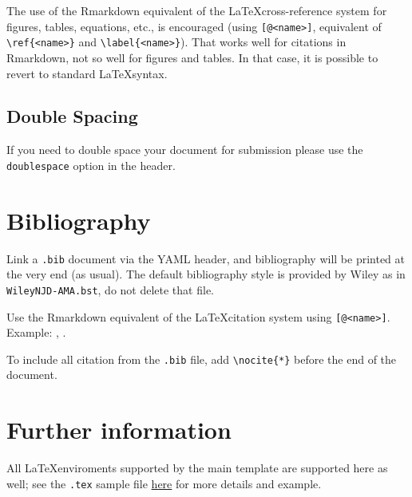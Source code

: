 \documentclass[AMA,STIX1COL,]{WileyNJD-v2}
\begin{document}
The use of the Rmarkdown equivalent of the \LaTeX cross-reference system
for figures, tables, equations, etc., is encouraged (using
\texttt{{[}@\textless{}name\textgreater{}{]}}, equivalent of
\texttt{\textbackslash{}ref\{\textless{}name\textgreater{}\}} and
\texttt{\textbackslash{}label\{\textless{}name\textgreater{}\}}). That
works well for citations in Rmarkdown, not so well for figures and
tables. In that case, it is possible to revert to standard
\LaTeX syntax.

\hypertarget{double-spacing}{%
\subsection{Double Spacing}\label{double-spacing}}

If you need to double space your document for submission please use the
\texttt{doublespace} option in the header.

\hypertarget{bibliography}{%
\section{Bibliography}\label{bibliography}}

Link a \texttt{.bib} document via the YAML header, and bibliography will
be printed at the very end (as usual). The default bibliography style is
provided by Wiley as in \texttt{WileyNJD-AMA.bst}, do not delete that
file.

Use the Rmarkdown equivalent of the \LaTeX citation system using
\texttt{{[}@\textless{}name\textgreater{}{]}}. Example:
\citep{Taylor1937}, \citep{Knupp1999, Kamm2000}.

To include all citation from the \texttt{.bib} file, add
\texttt{\textbackslash{}nocite\{*\}} before the end of the document.

\hypertarget{further-information}{%
\section{Further information}\label{further-information}}

All \LaTeX enviroments supported by the main template are supported here
as well; see the \texttt{.tex} sample file
\href{http://onlinelibrary.wiley.com/journal/10.1002/(ISSN)1097-0258/homepage/la_tex_class_file.htm}{here}
for more details and example.


\end{document}
